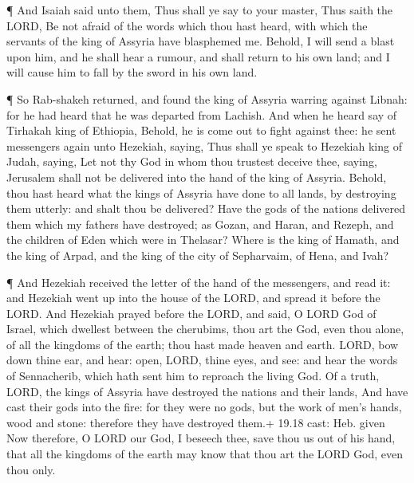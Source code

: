  ¶ And Isaiah said unto them, Thus shall ye say to your
master, Thus saith the LORD, Be not afraid of the words which thou hast
heard, with which the servants of the king of Assyria have blasphemed
me.  Behold, I will send a blast upon him, and he shall hear
a rumour, and shall return to his own land; and I will cause him to fall
by the sword in his own land.

 ¶ So Rab-shakeh returned, and found the king of Assyria
warring against Libnah: for he had heard that he was departed from
Lachish.  And when he heard say of Tirhakah king of
Ethiopia, Behold, he is come out to fight against thee: he sent
messengers again unto Hezekiah, saying,  Thus shall ye
speak to Hezekiah king of Judah, saying, Let not thy God in whom thou
trustest deceive thee, saying, Jerusalem shall not be delivered into the
hand of the king of Assyria.  Behold, thou hast heard what
the kings of Assyria have done to all lands, by destroying them utterly:
and shalt thou be delivered?  Have the gods of the nations
delivered them which my fathers have destroyed; as Gozan, and Haran, and
Rezeph, and the children of Eden which were in Thelasar? 
Where is the king of Hamath, and the king of Arpad, and the king of the
city of Sepharvaim, of Hena, and Ivah?

 ¶ And Hezekiah received the letter of the hand of the
messengers, and read it: and Hezekiah went up into the house of the
LORD, and spread it before the LORD.  And Hezekiah prayed
before the LORD, and said, O LORD God of Israel, which dwellest between
the cherubims, thou art the God, even thou alone, of all the kingdoms of
the earth; thou hast made heaven and earth.  LORD, bow down
thine ear, and hear: open, LORD, thine eyes, and see: and hear the words
of Sennacherib, which hath sent him to reproach the living God.
 Of a truth, LORD, the kings of Assyria have destroyed the
nations and their lands,  And have cast their gods into the
fire: for they were no gods, but the work of men's hands, wood and
stone: therefore they have destroyed them.+ 19.18 cast: Heb. given
 Now therefore, O LORD our God, I beseech thee, save thou
us out of his hand, that all the kingdoms of the earth may know that
thou art the LORD God, even thou only.

